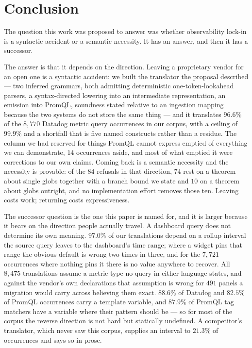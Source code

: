 
\section{Conclusion}
\label{s2:sec:conclusion}

The question this work was proposed to answer was whether observability lock-in is a
syntactic accident or a semantic necessity. It has an answer, and then it has a successor.

The answer is that it depends on the direction. Leaving a proprietary vendor for an open
one is a syntactic accident: we built the translator the proposal described --- two inferred
grammars, both admitting deterministic one-token-lookahead parsers, a syntax-directed
lowering into an intermediate representation, an emission into PromQL, soundness stated
relative to an ingestion mapping because the two systems do not store the same thing ---
and it translates $96.6\%$ of the $8{,}770$ Datadog metric query occurrences in our corpus,
with a ceiling of $99.9\%$ and a shortfall that is five named constructs rather than a
residue. The column we had reserved for things PromQL cannot express emptied of everything
we can demonstrate, $14$ occurrences aside, and most of what emptied it were corrections to
our own claims. Coming back is a semantic necessity and the necessity is provable: of the
$84$ refusals in that direction, $74$ rest on a theorem about single globs together with a
branch bound we state and $10$ on a theorem about globs outright, and no implementation
effort removes those ten. Leaving costs work; returning costs expressiveness.

The successor question is the one this paper is named for, and it is larger because it bears
on the direction people actually travel. A dashboard query does not determine its own
meaning. $97.0\%$ of our translations depend on a rollup interval the source query leaves
to the dashboard's time range; where a widget pins that range the obvious default is wrong
two times in three, and for the $7{,}721$ occurrences where nothing pins it there is no
value anywhere to recover. All $8{,}475$ translations assume a metric type no query in
either language states, and against the vendor's own declarations that assumption is wrong
for $491$ panels a migration would carry across believing them exact. $88.6\%$ of Datadog
and $82.5\%$ of PromQL occurrences carry a template variable, and $87.9\%$ of PromQL tag
matchers have a variable where their pattern should be --- so for most of the corpus the
reverse direction is not hard but statically undefined. A competitor's translator, which
never saw this corpus, supplies an interval to $21.3\%$ of occurrences and says so in
prose.


